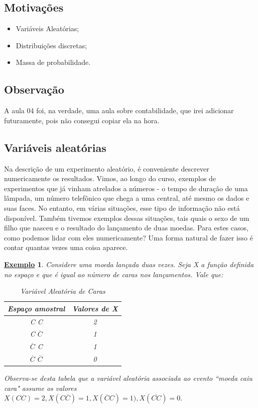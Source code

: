 \documentclass{article}
\newtheorem{example}{\underline{Exemplo}}
\begin{document}
\subsection{Motivações}
\begin{itemize}
  \item Variáveis Aleatórias;
  \item Distribuições discretas;
  \item Massa de probabilidade.
\end{itemize}
\subsection{Observação}
  A aula 04 foi, na verdade, uma aula sobre contabilidade, que irei adicionar futuramente, pois não consegui copiar ela na hora.
\subsection{Variáveis aleatórias}
  Na descrição de um experimento aleatório, é conveniente descrever numericamente os resultados.
Vimos, ao longo do curso, exemplos de experimentos que já vinham atrelados a números - o tempo de duração
de uma lâmpada, um número telefônico que chega a uma central, até mesmo os dados e suas faces. No entanto,
em várias situações, esse tipo de informação não está disponível. Também tivemos exemplos
dessas situações, tais quais o sexo de um filho que nasceu e o resultado do lançamento de duas moedas.
Para estes casos, como podemos lidar com eles numericamente? Uma forma natural de fazer
isso é contar quantas vezes uma coisa aparece.
\begin{example}
  Considere uma moeda lançada duas vezes. Seja X a função definida no espaço e que é
igual ao número de caras nos lançamentos. Vale que:
\begin{center}
  \begin{table}[h!]
  \caption{Variável Aleatória de Caras}
  \centering
    \begin{tabular}{| c | c |}
      \hline
      Espaço amostral & Valores de X\\
      \hline
      C C & 2\\
      C \(\overline{C}\) & 1\\
      \(\overline{C}\) C & 1\\
      \(\overline{C}\) \(\overline{C}\) & 0\\
      \hline
    \end{tabular}
  \end{table}
\end{center}
  Observa-se desta tabela que a variável aleatória associada ao evento ``moeda caiu cara" assume os valores
 \(X(CC) = 2, X(C\overline{C})=1, X(\overline{C}C)=1), X(\overline{CC}) = 0.\)
\end{example}
\end{document}
